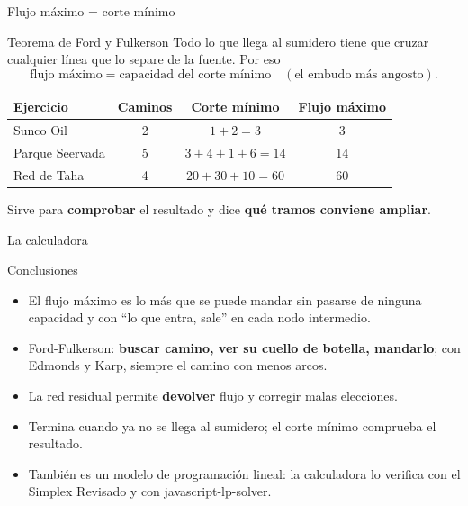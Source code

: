 \documentclass[aspectratio=169]{beamer}
\begin{document}
\begin{frame}{Flujo máximo = corte mínimo}
  \begin{block}{Teorema de Ford y Fulkerson}
    Todo lo que llega al sumidero tiene que cruzar cualquier línea que lo separe de la fuente. Por eso
    \[ \text{flujo máximo} = \text{capacidad del corte mínimo} \quad (\text{el embudo más angosto}). \]
  \end{block}
  \medskip
  \centering
  \begin{tabular}{lccc}
    \toprule
    \textbf{Ejercicio} & \textbf{Caminos} & \textbf{Corte mínimo} & \textbf{Flujo máximo} \\
    \midrule
    Sunco Oil & 2 & $1 + 2 = 3$ & 3 \\
    Parque Seervada & 5 & $3 + 4 + 1 + 6 = 14$ & 14 \\
    Red de Taha & 4 & $20 + 30 + 10 = 60$ & 60 \\
    \bottomrule
  \end{tabular}

  \medskip
  \raggedright
  Sirve para \textbf{comprobar} el resultado y dice \textbf{qué tramos conviene ampliar}.
\end{frame}

\begin{frame}{La calculadora}
  \centering
\end{frame}

\begin{frame}{Conclusiones}
  \begin{itemize}\setlength{\itemsep}{0.6em}
    \item El flujo máximo es lo más que se puede mandar sin pasarse de ninguna capacidad y con
          ``lo que entra, sale'' en cada nodo intermedio.
    \item Ford-Fulkerson: \textbf{buscar camino, ver su cuello de botella, mandarlo}; con Edmonds y Karp, siempre
          el camino con menos arcos.
    \item La red residual permite \textbf{devolver} flujo y corregir malas elecciones.
    \item Termina cuando ya no se llega al sumidero; el corte mínimo comprueba el resultado.
    \item También es un modelo de programación lineal: la calculadora lo verifica con el Simplex Revisado y con
          javascript-lp-solver.
  \end{itemize}
\end{frame}
\end{document}

